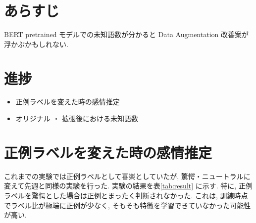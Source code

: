 \documentclass[twocolumn]{jarticle}     %
\begin{document}

\section{あらすじ}
BERT\cite{BERT} pretrained モデルでの未知語数が分かると Data Augmentation 改善案が浮かぶかもしれない.

\section{進捗}

\begin{itemize}
  \item 正例ラベルを変えた時の感情推定
  \item オリジナル ・ 拡張後における未知語数
\end{itemize}

\section{正例ラベルを変えた時の感情推定}

これまでの実験では正例ラベルとして喜楽としていたが, 驚愕・ニュートラルに変えて先週と同様の実験を行った. 実験の結果を表\ref{tab:result} に示す. 特に, 正例ラベルを驚愕とした場合は正例とまったく判断されなかった. これは, 訓練時点でラベル比が極端に正例が少なく, そもそも特徴を学習できていなかった可能性が高い.
\end{document}

